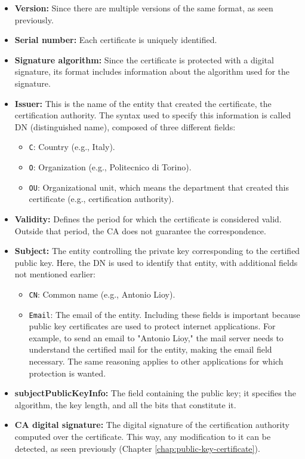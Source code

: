 \begin{itemize}
    \item \textbf{Version:} Since there are multiple versions of the same format, as seen previously.
    \item \textbf{Serial number:} Each certificate is uniquely identified.
    \item \textbf{Signature algorithm:} Since the certificate is protected with a digital signature, its format includes information about the algorithm used for the signature.
    \item \textbf{Issuer:} This is the name of the entity that created the certificate, the certification authority. The syntax used to specify this information is called DN (distinguished name), composed of three different fields:
    \begin{itemize}
        \item \texttt{C}: Country (e.g., Italy).
        \item \texttt{O}: Organization (e.g., Politecnico di Torino).
        \item \texttt{OU}: Organizational unit, which means the department that created this certificate (e.g., certification authority).
    \end{itemize}
    \item \textbf{Validity:} Defines the period for which the certificate is considered valid. Outside that period, the CA does not guarantee the correspondence.
    \item \textbf{Subject:} The entity controlling the private key corresponding to the certified public key. Here, the DN is used to identify that entity, with additional fields not mentioned earlier:
    \begin{itemize}
        \item \texttt{CN}: Common name (e.g., Antonio Lioy).
        \item \texttt{Email}: The email of the entity. Including these fields is important because public key certificates are used to protect internet applications. For example, to send an email to "Antonio Lioy," the mail server needs to understand the certified mail for the entity, making the email field necessary. The same reasoning applies to other applications for which protection is wanted.
    \end{itemize}
    \item \textbf{subjectPublicKeyInfo:} The field containing the public key; it specifies the algorithm, the key length, and all the bits that constitute it.
    \item \textbf{CA digital signature:} The digital signature of the certification authority computed over the certificate. This way, any modification to it can be detected, as seen previously (Chapter \ref{chap:public-key-certificate}).
\end{itemize}

